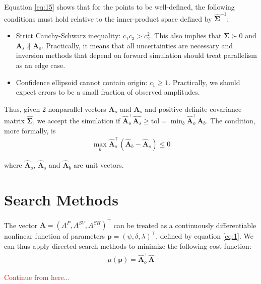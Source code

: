 \documentclass[preprint]{seismica}
\begin{document}
    Equation \ref{eq:15} shows that for the points to be well-defined, the following conditions
    must hold relative to the inner-product space defined by $\hat{\bm{\Sigma}}^{-1}$:
    
    \begin{itemize}
      \item Strict Cauchy-Schwarz inequality: $c_1c_3 > c_2^2$. This also implies that
        $\hat{\bm{\Sigma}} \succ 0$ and $\bm{A}_s \nparallel \bm{A}_o$. Practically, it means that all
        uncertainties are necessary and inversion methods that depend on forward simulation should
        treat parallelism as an edge case.
      \item Confidence ellipsoid cannot contain origin: $c_1 \geq 1$. Practically, we should expect
      errors to be a small fraction of observed amplitudes.
    \end{itemize}

    Thus, given 2 nonparallel vectors $\bm{A}_o$ and $\bm{A}_s$ and positive definite covariance
    matrix $\hat{\bm{\Sigma}}$, we accept the simulation if $\hat{\bm{A}}_o^\top \hat{\bm{A}_s} \geq \text{tol} 
    = \min_b \hat{\bm{A}}_o^\top \hat{\bm{A}_b}$. The condition, more formally, is
    \begin{align} \label{eq:16}
      \max_b \hat{\bm{A}}_o^\top (\hat{\bm{A}}_b - \hat{\bm{A}}_s) \leq 0
    \end{align}

    \noindent where $\hat{\bm{A}}_o$, $\hat{\bm{A}}_s$ and $\hat{\bm{A}}_b$ are unit vectors.


\section{Search Methods} \label{sec:algorithms}

    The vector $\bm{A} = (A^P, A^{SV}, A^{SH})^\top$ can be treated as a continuously differentiable nonlinear function of
    parameters $\bm{p} = (\psi, \delta, \lambda)^\top$, defined by equation \ref{eq:1}. We can thus apply
    directed search methods to minimize the following cost function:
    \begin{align} \label{eq:17}
      \mu(\bm{p}) = \hat{\bm{A}}_o^\top \hat{\bm{A}}
    \end{align}

    \textcolor{red}{Continue from here...}
\end{document}
